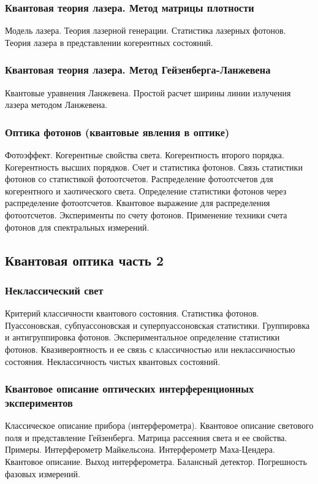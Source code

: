 \subsubsection{Квантовая теория лазера. Метод матрицы плотности}
Модель лазера. Теория лазерной генерации. Статистика лазерных
фотонов. Теория лазера в представлении когерентных состояний.
\subsubsection{Квантовая теория лазера. Метод Гейзенберга-Ланжевена}
Квантовые уравнения Ланжевена. Простой расчет ширины линии излучения
лазера методом Ланжевена.
\subsubsection{Оптика фотонов (квантовые явления в оптике)}
Фотоэффект.
Когерентные свойства света.
Когерентность второго порядка.
Когерентность высших порядков.
Счет и статистика фотонов.
Связь статистики фотонов со статистикой фотоотсчетов.
Распределение фотоотсчетов для когерентного и хаотического
света.
Определение статистики фотонов через распределение
фотоотсчетов.
Квантовое выражение для распределения фотоотсчетов.
Эксперименты по счету фотонов. Применение техники счета
фотонов для спектральных измерений.

\subsection{Квантовая оптика часть 2}
\subsubsection{Неклассический свет}
Критерий классичности квантового состояния. Статистика
фотонов. Пуассоновская, субпуассоновская и суперпуассоновская
статистики. Группировка и антигруппировка фотонов. Экспериментальное
определение статистики фотонов. Квазивероятность и ее связь с
классичностью или неклассичностью состояния. Неклассичность чистых квантовых состояний.
\subsubsection{Квантовое описание оптических интерференционных
  экспериментов}
Классическое описание прибора (интерферометра).
Квантовое описание светового поля и представление Гейзенберга.
Матрица рассеяния света и ее свойства.
Примеры. Интерферометр Майкельсона. Интерферометр Маха-Цендера. 
Квантовое описание. Выход интерферометра. Балансный детектор. Погрешность фазовых измерений.
